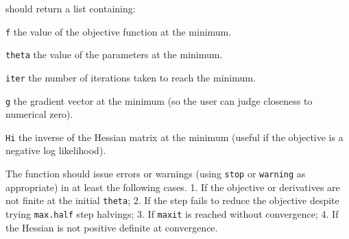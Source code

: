 \documentclass[10pt] {article}
\begin{document}
 should return a list containing:
\begin{trivlist}
\item {\tt f} the value of the objective function at the minimum.
\item {\tt theta} the value of the parameters at the minimum.
\item {\tt iter} the number of iterations taken to reach the minimum.
\item {\tt g} the gradient vector at the minimum (so the user can judge closeness to numerical zero).
\item {\tt Hi} the inverse of the Hessian matrix at the minimum (useful if the objective is a negative log likelihood). 
\end{trivlist} 

The function should issue errors or warnings (using {\tt stop} or {\tt warning} as appropriate) in at least the following cases. 1. If the objective or derivatives are not finite at the initial {\tt theta}; 2. If the step fails to reduce the objective despite trying {\tt max.half} step halvings; 3. If {\tt maxit} is reached without convergence; 4. If the Hessian is not positive definite at convergence.

\bigskip
\end{document}
